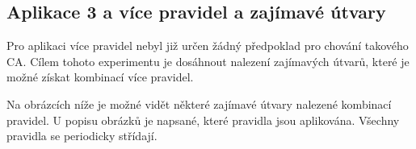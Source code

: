 \subsection{Aplikace 3 a více pravidel a zajímavé útvary}
Pro aplikaci více pravidel nebyl již určen žádný předpoklad pro chování takového CA.
Cílem tohoto experimentu je dosáhnout nalezení zajímavých útvarů, které je možné
získat kombinací více pravidel.

Na obrázcích níže je možné vidět některé zajímavé útvary nalezené kombinací pravidel.
U popisu obrázků je napsané, které pravidla jsou aplikována.
Všechny pravidla se periodicky střídají.

\begin{center}
	\begin{minipage}{0.32\linewidth}
	\end{minipage}
	\hfill
	\begin{minipage}{0.32\linewidth}
	\end{minipage}
	\hfill
	\begin{minipage}{0.32\linewidth}
	\end{minipage}%
\end{center}

\begin{center}
	\begin{minipage}{0.32\linewidth}
	\end{minipage}
	\hfill
	\begin{minipage}{0.32\linewidth}
	\end{minipage}
	\hfill
	\begin{minipage}{0.32\linewidth}
	\end{minipage}%
\end{center}

\begin{center}
	\begin{minipage}{0.32\linewidth}
	\end{minipage}
	\hfill
	\begin{minipage}{0.32\linewidth}
	\end{minipage}
	\hfill
	\begin{minipage}{0.32\linewidth}
	\end{minipage}%
\end{center}

